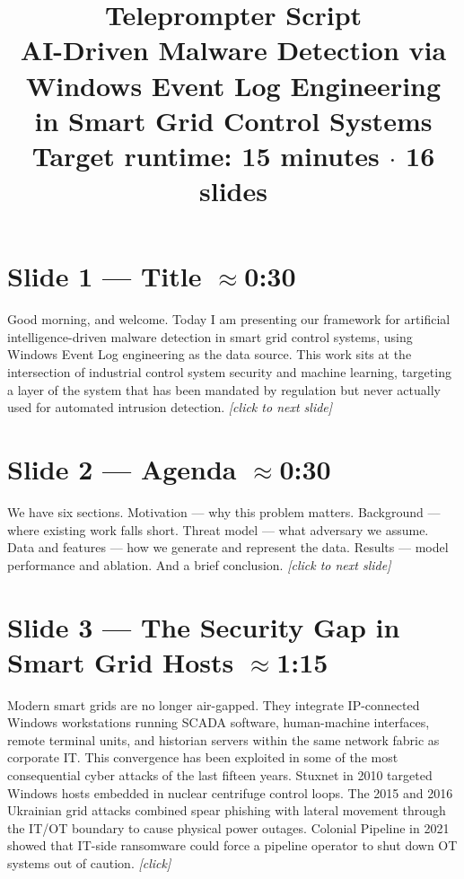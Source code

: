 \documentclass[14pt]{article}
\title{\textbf{Teleprompter Script}\\[0.3em]
\large AI-Driven Malware Detection via Windows Event Log Engineering\\
in Smart Grid Control Systems\\[0.3em]
\normalsize Target runtime: 15 minutes $\cdot$ 16 slides}
\author{}
\date{}
\begin{document}
\maketitle
\thispagestyle{fancy}

\tableofcontents
\newpage

\section*{Slide 1 — Title \hfill \normalfont\small $\approx$0:30}

Good morning, and welcome. Today I am presenting our framework for artificial intelligence-driven malware detection in smart grid control systems, using Windows Event Log engineering as the data source. This work sits at the intersection of industrial control system security and machine learning, targeting a layer of the system that has been mandated by regulation but never actually used for automated intrusion detection. \textit{[click to next slide]}

\section*{Slide 2 — Agenda \hfill \normalfont\small $\approx$0:30}

We have six sections. Motivation --- why this problem matters. Background --- where existing work falls short. Threat model --- what adversary we assume. Data and features --- how we generate and represent the data. Results --- model performance and ablation. And a brief conclusion. \textit{[click to next slide]}

\section*{Slide 3 — The Security Gap in Smart Grid Hosts \hfill \normalfont\small $\approx$1:15}

Modern smart grids are no longer air-gapped. They integrate IP-connected Windows workstations running SCADA software, human-machine interfaces, remote terminal units, and historian servers within the same network fabric as corporate IT. This convergence has been exploited in some of the most consequential cyber attacks of the last fifteen years. Stuxnet in 2010 targeted Windows hosts embedded in nuclear centrifuge control loops. The 2015 and 2016 Ukrainian grid attacks combined spear phishing with lateral movement through the IT/OT boundary to cause physical power outages. Colonial Pipeline in 2021 showed that IT-side ransomware could force a pipeline operator to shut down OT systems out of caution. \textit{[click]}
\end{document}
